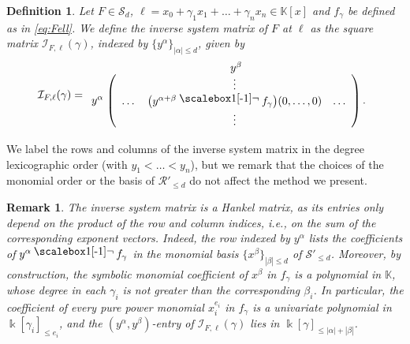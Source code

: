 \documentclass{amsart}
\theoremstyle{plain}
\newtheorem{definition}[definition]{Definition}
\newtheorem{remark}[remark]{Remark}
\renewcommand{\k}{\Bbbk}
\newcommand{\K}{\mathbb{K}}
\renewcommand{\S}{\mathcal{S}}
\def\a{\alpha}
\def\b{\beta}
\def\c{\gamma}
\newcommand{\contract}{\mathbin{\mathpalette\dointprod\relax}}
\newcommand{\dointprod}[2]{%
  \raisebox{\depth}{\scalebox{1}[-1]{$#1\lnot$}}}
\def\\k{{\mathsf{k}}}
\def\R{\mathcal{R}}
\numberwithin{equation}{section}
\begin{document}
\begin{definition} \label{defn:IFell}
    Let $F \in \S_d$, $\ell = x_0 + \c_1 x_1 + \dots + \c_n x_n \in \K[x]$ and $f_{\c}$ be defined as in \cref{eq:Fell}.
    We define the \emph{inverse system matrix} of $F$ at $\ell$ as the square matrix $\mathcal{I}_{F, \ell}(\gamma)$, indexed by $\{y^{\a}\}_{|\a| \leq d}$, given by 
\[
\mathcal{I}_{F,\ell}(\gamma) = \begin{array}{c@{\;}c}
 & y^{\b} \\[-2pt]
y^{\a} &
\left( \begin{array}{ccc}
 & \vdots & \\
\dots & \big(y^{\alpha+\beta} \contract f_{\c}\big)(0,\dots,0) & \dots \\
 & \vdots &
\end{array} \right).
\end{array}
\]
\end{definition}
We label the rows and columns of the inverse system matrix in the degree lexicographic order (with $y_1<\ldots<y_n$), but we remark that the choices of the monomial order or the basis of $\R'_{\leq d}$ do not affect the method we present.

\begin{remark} \label{rmk:HankelStructure}
    The inverse system matrix is a Hankel matrix, as its entries only depend on the product of the row and column indices, i.e., on the sum of the corresponding exponent vectors.
    Indeed, the row indexed by $y^{\a}$ lists the coefficients of $y^{\a} \contract f_{\c}$ in the monomial basis $\{x^{\b}\}_{|\b|\leq d}$ of $\S'_{\leq d}$.
    Moreover, by construction, the symbolic monomial coefficient of $x^{\b}$ in $f_{\c}$ is a polynomial in $\K$, whose degree in each $\c_i$ is not greater than the corresponding $\b_i$.
    In particular, the coefficient of every pure power monomial $x_i^{e_i}$ in $f_{\c}$ is a univariate polynomial in $\k[\c_i]_{\leq e_i}$, and the $(y^{\a},y^{\b})$-entry of $\mathcal{I}_{F,\ell}(\gamma)$ lies in $\k[\c]_{\leq |\a|+|\b|}$.
\end{remark}
\end{document}
